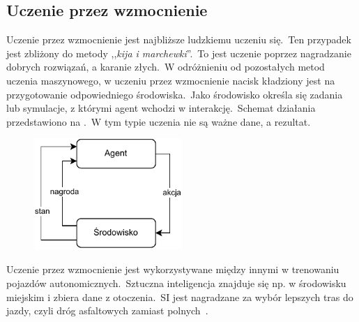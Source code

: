 \subsection{Uczenie przez wzmocnienie}
Uczenie przez wzmocnienie jest najbliższe ludzkiemu uczeniu się.\ Ten przypadek jest zbliżony do metody ,,\textit{kija i marchewki}''.\ To jest uczenie poprzez nagradzanie dobrych rozwiązań, a karanie złych.\ W odróżnieniu od pozostałych metod uczenia maszynowego, w uczeniu przez wzmocnienie nacisk kładziony jest na przygotowanie odpowiedniego środowiska.\ Jako środowisko określa się zadania lub symulacje, z którymi agent wchodzi w interakcję.\ Schemat działania przedstawiono na .\ W tym typie uczenia nie są ważne dane, a rezultat.

\begin{figure}[H]
    \centering
    \includegraphics[width=0.5\textwidth]{images/reinforcemen}
    \label{fig:reinforcemenet}
\end{figure}

Uczenie przez wzmocnienie jest wykorzystywane między innymi w trenowaniu pojazdów autonomicznych.\ Sztuczna inteligencja znajduje się np. w środowisku miejskim i zbiera dane z otoczenia.\ SI jest nagradzane za wybór lepszych tras do jazdy, czyli dróg asfaltowych zamiast polnych~\cite{AiScience, Mahesh2018}.


